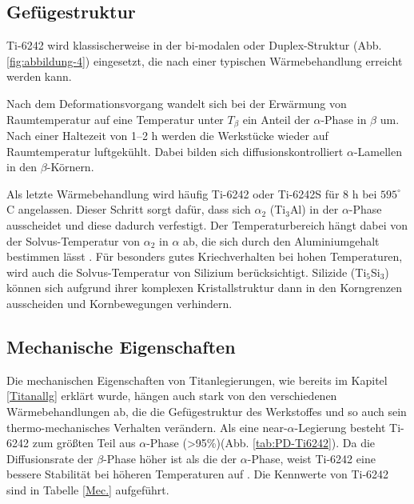 
\subsection{Gefügestruktur}

Ti-6242 wird klassischerweise in der bi-modalen oder Duplex-Struktur (Abb. \ref{fig:abbildung-4}) eingesetzt, die nach einer typischen Wärmebehandlung  erreicht werden kann.

Nach dem Deformationsvorgang wandelt sich bei der Erwärmung von Raumtemperatur  auf eine Temperatur unter $T_{\beta}$  ein Anteil der $\alpha$-Phase in $\beta$ um. Nach einer Haltezeit von 1--2 h werden die Werkstücke wieder auf Raumtemperatur luftgekühlt.
Dabei bilden sich diffusionskontrolliert $\alpha$-Lamellen in den $\beta$-Körnern.


Als letzte Wärmebehandlung wird häufig Ti-6242 oder Ti-6242S für 8 h bei $595^\circ$C angelassen. Dieser Schritt sorgt dafür, dass sich $\alpha_2$ (Ti$_3$Al) in der $\alpha$-Phase ausscheidet und diese dadurch verfestigt. Der Temperaturbereich hängt dabei von der Solvus-Temperatur von $\alpha_2$ in $\alpha$ ab, die sich durch den Aluminiumgehalt bestimmen lässt \cite{Lutjering.2007}.
Für besonders gutes Kriechverhalten bei hohen Temperaturen, wird auch die Solvus-Temperatur von Silizium berücksichtigt. Silizide (Ti$_5$Si$_3$) können sich aufgrund ihrer komplexen Kristallstruktur dann in den Korngrenzen ausscheiden und Kornbewegungen verhindern.

\subsection{Mechanische Eigenschaften}

Die mechanischen Eigenschaften von Titanlegierungen, wie bereits im Kapitel \ref{Titanallg} erklärt wurde, hängen auch stark von den verschiedenen Wärmebehandlungen ab, die die Gefügestruktur des Werkstoffes und so auch sein thermo-mechanisches Verhalten verändern.
Als eine near-$\alpha$-Legierung besteht Ti-6242 zum größten Teil aus $\alpha$-Phase (>95\%)(Abb. \ref{tab:PD-Ti6242}). Da die Diffusionsrate der $\beta$-Phase höher ist als die der $\alpha$-Phase, weist Ti-6242 eine bessere Stabilität bei höheren Temperaturen auf \cite{Prasad.2017}. Die Kennwerte von Ti-6242 sind in Tabelle \ref{Mec.} aufgeführt.

